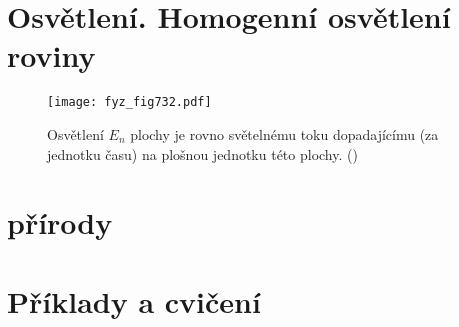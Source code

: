   \section{Osvětlení. Homogenní osvětlení roviny}\label{fyz:IIchapXIIsecVI}

    \begin{figure}[ht!] %
      \centering
      \texttt{[image: fyz\_fig732.pdf]}
      \caption{Osvětlení \(E_n\) plochy je rovno světelnému toku dopadajícímu (za jednotku času) na
        plošnou jednotku této plochy. (\cite[s.~220]{Feynman02})}
      \label{fyz:fig732}
    \end{figure}

  \section{ přírody}\label{fyz:IIchapXIIsecVII}



  \section{Příklady a cvičení}\label{fyz:IIchapXIIsecVIII}














